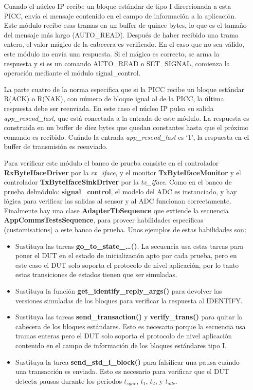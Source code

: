 \documentclass[a4paper, twoside, 11pt]{report}
\begin{document}
Cuando el núcleo IP recibe un bloque estándar de tipo I direccionada a esta PICC, envía el mensaje contenido en el campo de información a la aplicación. Este módulo recibe esas tramas en un buffer de quince bytes, lo que es el tamaño del mensaje más largo (AUTO\_READ). Después de haber recibido una trama entera, el valor mágico de la cabecera es verificado. En el caso que no sea válido, este módulo no envía una respuesta. Si el mágico es correcto, se arma la respuesta y si es un comando AUTO\_READ o SET\_SIGNAL, comienza la operación mediante el módulo signal\_control.

La parte cuatro de la norma especifica que si la PICC recibe un bloque estándar R(ACK) o R(NAK), con número de bloque igual al de la PICC, la última respuesta debe ser reenviada. En este caso el núcleo IP pulsa su salida \textit{app\_resend\_last}, que está conectada a la entrada de este módulo. La respuesta es construida en un buffer de diez bytes que quedan constantes hasta que el próximo comando es recibido. Cuándo la entrada \textit{app\_resend\_last} es ‘1’, la respuesta en el buffer de transmisión es reenviado.

Para verificar este módulo el banco de prueba consiste en el controlador \textbf{RxByteIfaceDriver} por la \textit{rx\_iface}, y el monitor \textbf{TxByteIfaceMonitor} y el controlador \textbf{TxByteIfaceSinkDriver} por la \textit{tx\_iface}. Como en el banco de prueba delmódulo: \textbf{signal\_control}, el modelo del ADC es instanciado, y hay lógica para verificar las salidas al sensor y al ADC funcionan correctamente. Finalmente hay una clase \textbf{AdapterTbSequence} que extiende la secuencia \textbf{AppCommsTestsSequence}, para proveer habilidades específicas (customisations) a este banco de prueba. Unos ejemplos de estas habilidades son:

\begin{itemize}
  \item Sustituya las tareas \textbf{go\_to\_state\_…()}. La secuencia usa estas tareas para poner el DUT en el estado de inicialización apto por cada prueba, pero en este caso el DUT solo soporta el protocolo de nivel aplicación, por lo tanto estas transiciones de estados tienen que ser simuladas.
  \item Sustituya la función \textbf{get\_identify\_reply\_args()} para devolver las versiones simuladas de los bloques para verificar la respuesta al IDENTIFY.
  \item Sustituya las tareas \textbf{send\_transaction()} y \textbf{verify\_trans()} para quitar la cabecera de los bloques estándares. Esto es necesario porque la secuencia usa tramas enteras pero el DUT solo soporta el protocolo de nivel aplicación contenido en el campo de información de los bloques estándares tipo I.
  \item Sustituya la tarea \textbf{send\_std\_i\_block()} para falsificar una pausa cuándo una transacción es enviada. Esto es necesario para verificar que el DUT detecta pausas durante los periodos $t_{sync}$, $t_1$, $t_2$, y $t_{adc}$.
\end{itemize}
\end{document}
